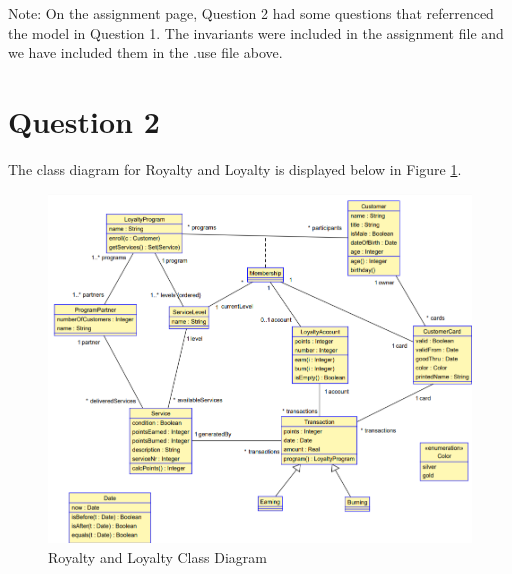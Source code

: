 \documentclass{article}
\begin{document}
	\noindent
	Note: On the assignment page, Question 2 had some questions that referrenced the model in Question 1. The invariants were included in the assignment file and we have included them in the .use file above.
	
	\newpage

\section*{Question 2}

	The class diagram for Royalty and Loyalty is displayed below in Figure \ref{fig:q2class}.
	\begin{figure}[h]
		\includegraphics[width=\linewidth]{Q2Class.png}
		\caption{Royalty and Loyalty Class Diagram}
		\label{fig:q2class}
	\end{figure}
	
\end{document}
